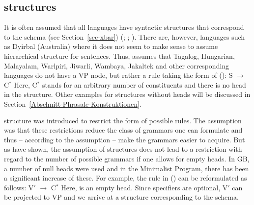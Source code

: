 \subsection{\xbar structures}
\label{sec-Diskussion-X-Bar}

It is often assumed that all languages have syntactic structures that
correspond to the \xbar schema (see Section~\ref{sec-xbar}) (\citealp[]{Pinker94a}; \citealp[, 14]{Meisel95a}; \citealp[]{PJ2005a}). There are, however, languages such as Dyirbal (Australia) where it does not seem
to make sense to assume hierarchical structure for sentences.
Thus, \citet[]{Bresnan2001a} assumes that Tagalog, Hungarian,
Malayalam, Warlpiri, Jiwarli, Wambaya,
Jakaltek
and other corresponding languages do not have a VP node, but rather a rule taking the form of (): 
\ea
S $\to$ C$^*$
\z
Here, C$^*$ stands for an arbitrary number of constituents and there is no head in the structure.
Other examples for structures without heads will be discussed in Section~\ref{Abschnitt-Phrasale-Konstruktionen}.

\xbar structure was introduced to restrict the form of possible rules. The assumption was that these restrictions reduce the class
of grammars one can formulate and thus -- according to the assumption -- make the grammars easier to
acquire. But as \citet{KP90a} have shown,
the assumption of \xbar structures does not lead to a restriction with regard to the number of possible grammars if one allows for empty heads.
In GB, a number of null heads were used and in the Minimalist Program\indexmp, there has been a
significant increase of these. For example, the rule in () can be reformulated as follows:
\ea
V$'$ $\to$ \vnull C$^*$
\z
Here, \vnull is an empty head. Since specifiers are optional, V$'$ can be projected to VP and we arrive at a structure corresponding to
the \xbar schema.

